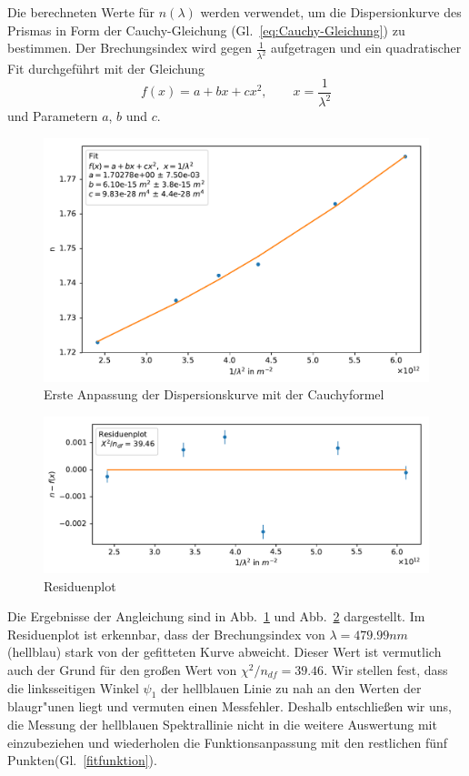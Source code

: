 \documentclass[12pt,a4paper]{article}
\begin{document}
Die berechneten Werte für $n(\lambda)$ werden verwendet, um die Dispersionkurve des Prismas in Form der Cauchy-Gleichung (Gl.~\eqref{eq:Cauchy-Gleichung}) zu bestimmen. Der Brechungsindex wird gegen $\frac{1}{\lambda^2}$ aufgetragen und ein quadratischer Fit durchgeführt mit der Gleichung
\begin{equation}\label{fitfunktion}
f(x)=a+bx+cx^2,\qquad x=\frac{1}{\lambda^2}
\end{equation}
und Parametern $a$, $b$ und $c$.\\
\newpage
\begin{figure}[H]
	\centering
	\includegraphics[width=0.95\linewidth]{Python/CdHg_Fit_Messfehler.pdf}
	\caption{ Erste Anpassung der Dispersionskurve mit der Cauchyformel}
	\label{CdHg_Fit_Messfehler}
\end{figure}
\begin{figure}[H]
	\centering
	\includegraphics[width=\linewidth]{Python/CdHg_Residuen_Messfehler.pdf}
	\caption{Residuenplot}
	\label{CdHg_Residuenplot_Messfehler}
\end{figure}
Die Ergebnisse der Angleichung sind in Abb.~\ref{CdHg_Fit_Messfehler} und Abb.~\ref{CdHg_Residuenplot_Messfehler} dargestellt. Im Residuenplot ist erkennbar, dass der Brechungsindex von $\lambda=479.99nm$ (hellblau) stark von der gefitteten Kurve abweicht. Dieser Wert ist vermutlich auch der Grund für den großen Wert von $\chi^2/n_{df}=39.46$. Wir stellen fest, dass die linksseitigen Winkel $\psi_1$ der hellblauen Linie zu nah an den Werten der blaugr"unen liegt und vermuten einen Messfehler. Deshalb entschließen wir uns, die Messung der hellblauen Spektrallinie nicht in die weitere Auswertung mit einzubeziehen und wiederholen die Funktionsanpassung mit den restlichen fünf Punkten(Gl.~\eqref{fitfunktion}).
\end{document}
